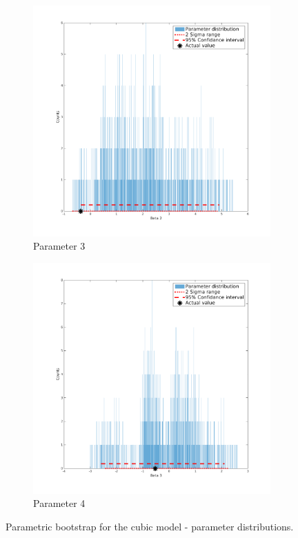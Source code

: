 \documentclass[11pt,a4paper,oneside]{report}
\begin{document}
\begin{figure}[H]
  \begin{subfigure}[b]{0.5\textwidth}
    \includegraphics[width=\textwidth, trim=0 0 0 0,clip=true]{figures/task5/parDistM3P3.png}
    \caption{Parameter 3}
  \end{subfigure}%
  \begin{subfigure}[b]{0.5\textwidth}
    \includegraphics[width=\textwidth, trim=0 0 0 0,clip=true]{figures/task5/parDistM3P4.png}
    \caption{Parameter 4}
  \end{subfigure}%
  
  \caption{Parametric bootstrap for the cubic model - parameter distributions.}
  \label{fig:c5distM3}
\end{figure}

\end{document}
